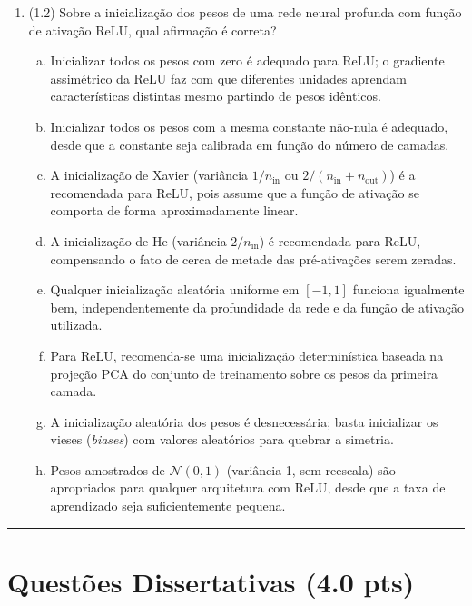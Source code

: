 \documentclass[11pt,a4paper]{article}
\begin{document}
\begin{enumerate}[1)]
\item (1.2) Sobre a inicialização dos pesos de uma rede neural profunda com função de ativação ReLU, qual afirmação é correta?
\begin{enumerate}[a)]
    \item Inicializar todos os pesos com zero é adequado para ReLU; o gradiente assimétrico da ReLU faz com que diferentes unidades aprendam características distintas mesmo partindo de pesos idênticos.
    \item Inicializar todos os pesos com a mesma constante não-nula é adequado, desde que a constante seja calibrada em função do número de camadas.
    \item A inicialização de Xavier (variância $1/n_{\text{in}}$ ou $2/(n_{\text{in}} + n_{\text{out}})$) é a recomendada para ReLU, pois assume que a função de ativação se comporta de forma aproximadamente linear.
    \item A inicialização de He (variância $2/n_{\text{in}}$) é recomendada para ReLU, compensando o fato de cerca de metade das pré-ativações serem zeradas.
    \item Qualquer inicialização aleatória uniforme em $[-1, 1]$ funciona igualmente bem, independentemente da profundidade da rede e da função de ativação utilizada.
    \item Para ReLU, recomenda-se uma inicialização determinística baseada na projeção PCA do conjunto de treinamento sobre os pesos da primeira camada.
    \item A inicialização aleatória dos pesos é desnecessária; basta inicializar os vieses (\textit{biases}) com valores aleatórios para quebrar a simetria.
    \item Pesos amostrados de $\mathcal{N}(0, 1)$ (variância 1, sem reescala) são apropriados para qualquer arquitetura com ReLU, desde que a taxa de aprendizado seja suficientemente pequena.
\end{enumerate}

\end{enumerate}

\rule{\linewidth}{0.4pt}

\pagebreak
\section*{Questões Dissertativas (4.0 pts)}
\end{document}
